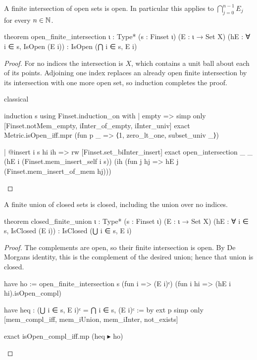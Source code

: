 \begin{proposition}
  \label{an1:thm:finite-intersection-of-open-sets-is-open}
  A finite intersection of open sets is open.
  In particular this applies to $\bigcap_{j=0}^{n-1}E_j$ for every $n\in\mathbb{N}$.

  \begin{lean}
    theorem open_finite_intersection {ι : Type*} (s : Finset ι)
        (E : ι → Set X) (hE : ∀ i ∈ s, IsOpen (E i)) :
        IsOpen (⋂ i ∈ s, E i)
  \end{lean}
\end{proposition}

\begin{proof}
  For no indices the intersection is $X$, which contains a unit ball about each of its points.
  Adjoining one index replaces an already open finite intersection by its intersection with one
  more open set, so induction completes the proof.

  \begin{lean}
    classical

    induction s using Finset.induction_on with
    | empty =>
      simp only [Finset.notMem_empty, iInter_of_empty, iInter_univ]
      exact Metric.isOpen_iff.mpr (fun p _ => ⟨1, zero_lt_one, subset_univ _⟩)

    | @insert i s hi ih =>
      rw [Finset.set_biInter_insert]
      exact open_intersection _ _ (hE i (Finset.mem_insert_self i s))
        (ih (fun j hj => hE j (Finset.mem_insert_of_mem hj)))
  \end{lean}

\end{proof}

\begin{corollary}
  \label{an1:cor:finite-union-of-closed-sets-is-closed}
  A finite union of closed sets is closed, including the union over no indices.

  \begin{lean}
    theorem closed_finite_union {ι : Type*} (s : Finset ι)
        (E : ι → Set X) (hE : ∀ i ∈ s, IsClosed (E i)) :
        IsClosed (⋃ i ∈ s, E i)
  \end{lean}
\end{corollary}

\begin{proof}
  The complements are open, so their finite intersection is open.
  By De Morgan\textquotesingle s identity, this is the complement of the desired union; hence that
  union is closed.

  \begin{lean}
    have ho := open_finite_intersection s (fun i => (E i)ᶜ)
      (fun i hi => (hE i hi).isOpen_compl)

    have heq : (⋃ i ∈ s, E i)ᶜ = ⋂ i ∈ s, (E i)ᶜ := by
      ext p
      simp only [mem_compl_iff, mem_iUnion, mem_iInter, not_exists]

    exact isOpen_compl_iff.mp (heq ▸ ho)
  \end{lean}

\end{proof}


